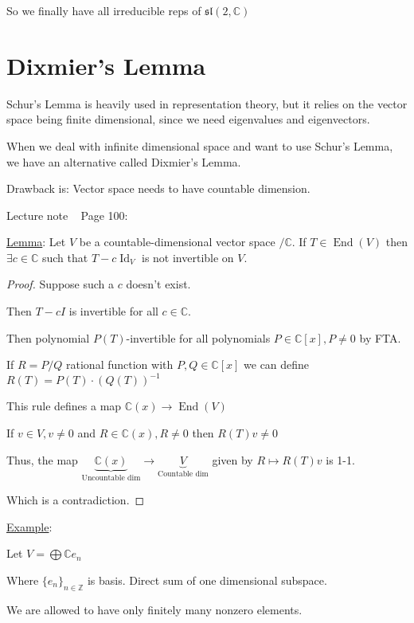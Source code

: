 \documentclass{article}
\theoremstyle{definition}
\begin{document}
So we finally have all irreducible reps of \(\mathfrak{sl}(2,\mathbb{C})\) 

\section*{Dixmier's Lemma}

Schur's Lemma is heavily used in representation theory, but it relies on the vector space being finite dimensional, since we need eigenvalues and eigenvectors.

When we deal with infinite dimensional space and want to use Schur's Lemma, we have an alternative called Dixmier's Lemma.

Drawback is: Vector space needs to have countable dimension.

Lecture note ~ Page 100:

\underline{Lemma}: Let \(V\) be a countable-dimensional vector space \(/ \mathbb{C}\). If \(T\in \operatorname{End}(V)\) then \(\exists c\in \mathbb{C}\) such that \(T-c \operatorname{Id}_V\) is not invertible on \(V\).   

\begin{proof}
    Suppose such a \(c\) doesn't exist.

    Then \(T - cI\) is invertible for all \(c\in\mathbb{C}\).
    
    Then polynomial \(P(T)\)-invertible for all polynomials \(P\in\mathbb{C} [x], P\neq 0\) by FTA.
    
    If \(R = P / Q\) rational function with \(P,Q\in\mathbb{C}[x]\) we can define \(R(T) = P(T) \cdot (Q(T))^{-1}\) 

    This rule defines a map \(\mathbb{C}(x) \to \operatorname{End}(V)\)
    
    If \(v\in V, v\neq 0\) and \(R\in\mathbb{C}(x), R\neq 0\) then \(R(T)v \neq 0\)
    
    Thus, the map \(\underbrace{\mathbb{C}(x)}_{\text{Uncountable dim}} \to \underbrace{V}_{\text{Countable dim}}\) given by \(R \mapsto R(T)v\) is 1-1.
    
    Which is a contradiction.
    
\end{proof}

\underline{Example}:

Let \(V = \bigoplus \mathbb{C} e_n\)

Where \(\{ e_n \}_{n\in\mathbb{Z}}\) is basis. Direct sum of one dimensional subspace.

We are allowed to have only finitely many nonzero elements.
\end{document}
